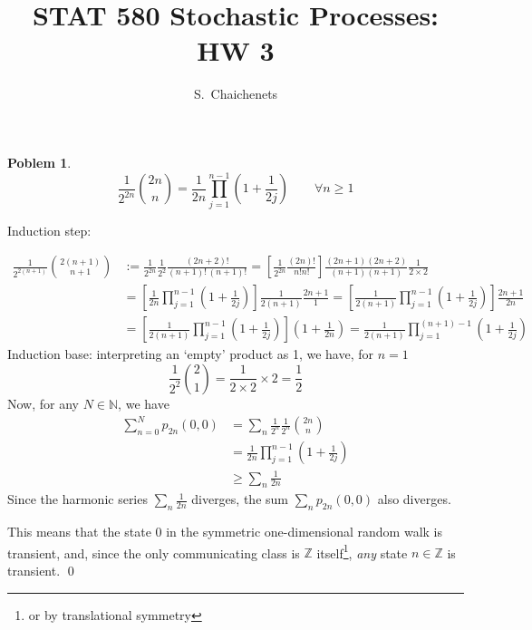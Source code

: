\documentclass[8pt,notitlepage]{report}
\newtheorem{problem}{Poblem}
\newenvironment{solution}[1][Solution]{\begin{trivlist}
    \item[\hskip \labelsep {\bfseries #1}]}{\end{trivlist}}
\begin{document}
\title{STAT 580 Stochastic Processes: HW 3}
\author{ S.\ Chaichenets }
\maketitle



\begin{problem}
\small
\begin{equation}
\frac{1}{2^{2n}} {2n \choose n} = \frac{1}{2n} \prod_{j=1}^{n-1} \left(1+\frac{1}{2j}\right)
\qquad \forall n\geq 1
\end{equation}
\normalsize
\end{problem}

\begin{solution}
Induction step:

\begin{equation}
\begin{split}
\frac{1}{2^{2(n+1)}} {2(n+1) \choose n+1} 
	& := \frac{1}{2^{2n}}\frac{1}{2^2} \frac{(2n+2)!}{(n+1)!\,(n+1)!} 
	 = \left[ \frac{1}{2^{2n}}\frac{(2n)!}{n!n!} \right]
		\frac{(2n+1)(2n+2)}{(n+1)(n+1)}\frac{1}{2\times2} 			\\
	& = \left[ \frac{1}{2n}\prod_{j=1}^{n-1} \left(1+\frac{1}{2j}\right) \right]
		\frac{1}{2(n+1)}\frac{2n+1}{1} 
	 = \left[ \frac{1}{2(n+1)}\prod_{j=1}^{n-1} \left(1+\frac{1}{2j}\right) \right]
		\frac{2n+1}{2n}								\\
	& = \left[ \frac{1}{2(n+1)}\prod_{j=1}^{n-1} \left(1+\frac{1}{2j}\right) \right]
		\left( 1 + \frac{1}{2n} \right)
	 = \frac{1}{2(n+1)}\prod_{j=1}^{(n+1)-1} \left(1+\frac{1}{2j}\right)
\end{split}
\end{equation}
Induction base: interpreting an `empty' product as 1, we have, for $n=1$
$$
\frac{1}{2^2}{2 \choose 1} = \frac{1}{2\times2} \times 2 = \frac{1}{2}
$$
Now, for any $N\in \mathbb{N}$, we have
\begin{equation}
\begin{split}
\sum_{n=0}^{N} p_{2n}(0,0) &= \sum_n \frac{1}{2^n}\frac{1}{2^n}{2n \choose n}		\\
			&= \frac{1}{2n} \prod_{j=1}^{n-1} \left(1+\frac{1}{2j}\right)	\\
			&\geq	\sum_{n}\frac{1}{2n}
\end{split}
\end{equation}
Since the harmonic series $\sum_n \frac{1}{2n}$ diverges, 
the sum $\sum_{n} p_{2n}(0,0)$ also diverges.

This means that the state $0$ in the symmetric one-dimensional random walk is transient,
and, since the only communicating class is $\mathbb{Z}$ itself\footnote{
	or by translational symmetry
}, {\it any} state $n\in \mathbb{Z}$ is transient.
\qed
\end{solution}
\end{document}
